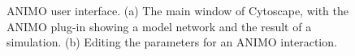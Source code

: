 \documentclass[submission,copyright,creativecommons]{eptcs}
\begin{document}
\begin{figure}[htbp]
\begin{center}
 \quad
{}
\caption{ANIMO user interface. (a) The main window of Cytoscape, with the ANIMO
plug-in showing a model network and the result of a simulation. (b) Editing the parameters for an ANIMO interaction.}
\end{center}
\end{figure}

\end{document}
